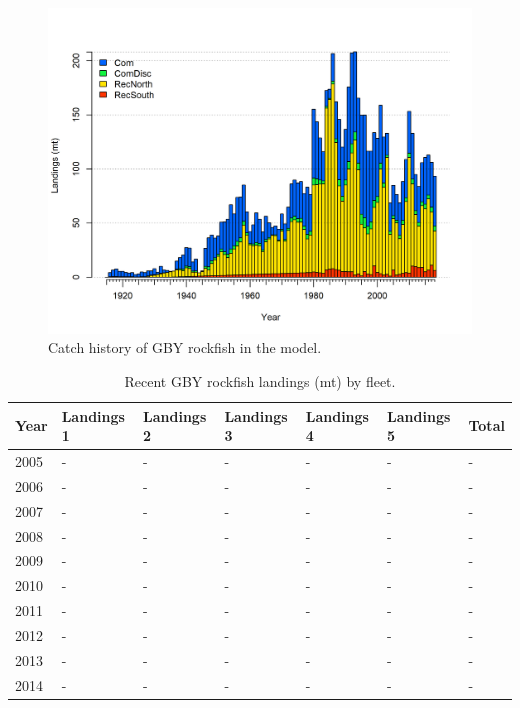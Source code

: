 \documentclass[12pt,]{article}
\begin{document}
\FloatBarrier

\begin{figure}
\centering
\includegraphics{r4ss/plots_mod1/catch2 landings stacked.png}
\caption{Catch history of GBY rockfish in the model.
\label{fig:r4ss_catches}}
\end{figure}

\begin{table}[ht]
\centering
\caption{Recent GBY rockfish landings (mt) by 
                                            fleet.} 
\label{tab:Exec_catch}
\begin{tabular}{l>{\centering}p{1in}>{\centering}p{1in}>{\centering}p{1in}>{\centering}p{.9in}>{\centering}p{.9in}>{\centering}p{.6in}}
  \hline
Year & Landings 1 & Landings 2 & Landings 3 & Landings 4 & Landings 5 & Total \\ 
  \hline
2005 & - & - & - & - & - & - \\ 
  2006 & - & - & - & - & - & - \\ 
  2007 & - & - & - & - & - & - \\ 
  2008 & - & - & - & - & - & - \\ 
  2009 & - & - & - & - & - & - \\ 
  2010 & - & - & - & - & - & - \\ 
  2011 & - & - & - & - & - & - \\ 
  2012 & - & - & - & - & - & - \\ 
  2013 & - & - & - & - & - & - \\ 
  2014 & - & - & - & - & - & - \\ 
   \hline
\end{tabular}
\end{table}
\end{document}

